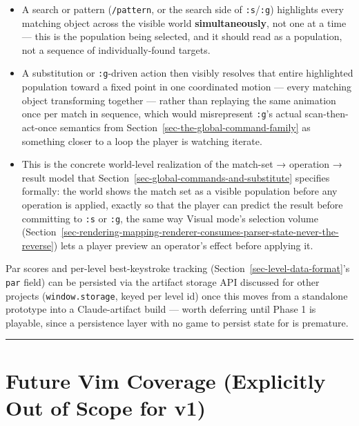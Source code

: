 \documentclass[11pt]{article}
\providecommand{\tightlist}{%
  \setlength{\itemsep}{0pt}\setlength{\parskip}{0pt}}
\begin{document}
\begin{itemize}
\tightlist
\item
  A search or pattern (\texttt{/pattern}, or the search side of \texttt{:s}/\texttt{:g})
  highlights every matching object across the visible world
  \textbf{simultaneously}, not one at a time --- this is the population being
  selected, and it should read as a population, not a sequence of
  individually-found targets.
\item
  A substitution or \texttt{:g}-driven action then visibly resolves that entire
  highlighted population toward a fixed point in one coordinated motion ---
  every matching object transforming together --- rather than replaying the
  same animation once per match in sequence, which would misrepresent
  \texttt{:g}'s actual scan-then-act-once semantics from Section~\ref{sec-the-global-command-family} as something
  closer to a loop the player is watching iterate.
\item
  This is the concrete world-level realization of the
  match-set → operation → result model that Section~\ref{sec-global-commands-and-substitute} specifies formally:
  the world shows the match set as a visible population before any operation
  is applied, exactly so that the player can predict the result before
  committing to \texttt{:s} or \texttt{:g}, the same way Visual mode's selection volume
  (Section~\ref{sec-rendering-mapping-renderer-consumes-parser-state-never-the-reverse}) lets a player preview an operator's effect before applying it.
\end{itemize}

Par scores and per-level best-keystroke tracking (Section~\ref{sec-level-data-format}'s \texttt{par} field)
can be persisted via the artifact storage API discussed for other projects
(\texttt{window.storage}, keyed per level id) once this moves from a standalone
prototype into a Claude-artifact build --- worth deferring until Phase 1 is
playable, since a persistence layer with no game to persist state for is
premature.

\begin{center}\rule{0.5\linewidth}{0.5pt}\end{center}

\hypertarget{sec-future-vim-coverage-explicitly-out-of-scope-for-v1}{%
\section{Future Vim Coverage (Explicitly Out of Scope for v1)}\label{sec-future-vim-coverage-explicitly-out-of-scope-for-v1}}
\end{document}
